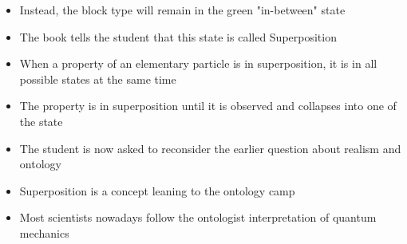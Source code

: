 \documentclass[11pt,twoside]{report} %
\begin{document}
\begin{itemize}
\begin{itemize}
		\item Instead, the block type will remain in the green "in-between" state
		\item The book tells the student that this state is called Superposition
		\item When a property of an elementary particle is in superposition, it is in all possible states at the same time
		\item The property is in superposition until it is observed and collapses into one of the state
		\item The student is now asked to reconsider the earlier question about realism and ontology
		\item Superposition is a concept leaning to the ontology camp
		\item Most scientists nowadays follow the ontologist interpretation of quantum mechanics
	\end{itemize}
\end{itemize}
\end{document}
